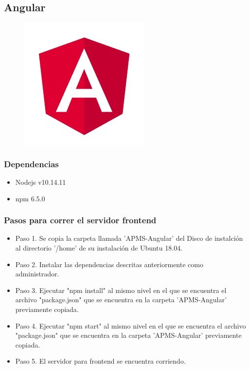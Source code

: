 \subsection{Angular}

\begin{figure}[H]
    \centering
    \includegraphics[width=0.3\linewidth]{images/tecnologias/angular.png}
\end{figure}

\subsubsection{Dependencias}

\begin{itemize}
    \item Nodejs v10.14.11
    \item npm 6.5.0
\end{itemize}

\subsubsection{Pasos para correr el servidor frontend}

\begin{itemize}
    \item Paso 1. Se copia la carpeta llamada 'APMS-Angular' del Disco de instalci\'on al
    directorio '/home' de su instalaci\'on de Ubuntu 18.04.
    \item Paso 2. Instalar las dependencias descritas anteriormente como administrador.
    \item Paso 3. Ejecutar "npm install" al mismo nivel en el que se encuentra el archivo
    "package.json" que se encuentra en la carpeta 'APMS-Angular' previamente copiada.
    \item Paso 4. Ejecutar "npm start"  al mismo nivel en el que se encuentra el archivo
    "package.json" que se encuentra en la carpeta 'APMS-Angular' previamente copiada.
    \item Paso 5. El servidor para frontend se encuentra corriendo.
\end{itemize}
